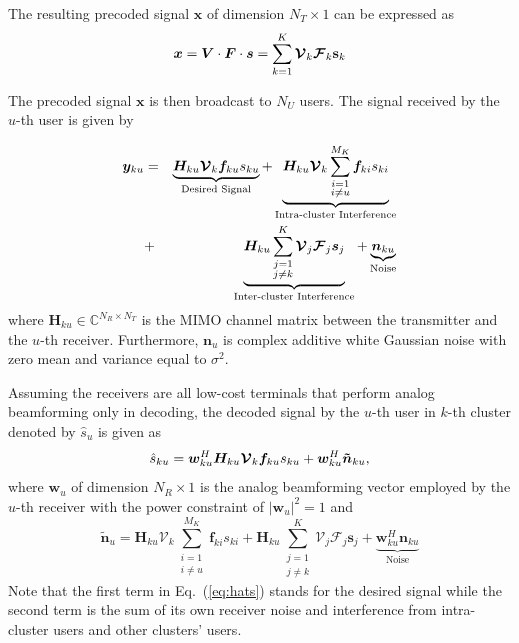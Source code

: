 \documentclass[conference]{IEEEtran}
\begin{document}
The resulting precoded signal $\bm x$ of dimension $N_T\times 1$  can be expressed as
\begin{equation}{\label{eq:transx}}
{\bm x} =  \bm{V}\cdot \bm{F}\cdot\bm{s} =\sum_{k=1}^K \bm{\mathcal{V}}_k \bm{\mathcal{F}}_k \mathbf{s}_k
\end{equation}

The precoded signal $\bm x$ is then broadcast to $N_U$ users. The signal received by the $u$-th user is given by

\begin{eqnarray}{\label{eq:rewrite}}
{\bm y}_{ku} &=&\underbrace{\bm{H}_{ku} \bm{\mathcal{V}}_k\bm{f}_{ku}{s}_{ku}}_\text{Desired Signal}+\underbrace{\bm{H}_{ku} \bm{\mathcal{V}}_k\sum_{\substack{i=1 \\ i\neq u}}^{M_K}\bm{f}_{ki}s_{ki}}_\text{Intra-cluster Interference} \nonumber\\
&+& \underbrace{\bm{H}_{ku}\sum_{\substack{j=1\\j\neq k}}^{K}\bm{\mathcal{V}}_j\bm{\mathcal{F}}_j\bm{s}_j}_\text{Inter-cluster Interference}+ \underbrace{\bm{n}_{ku}}_\text{Noise}
\end{eqnarray}
where $\bm{H}_{ku}$$\in\mathbb{C}^{N_R\times N_T}$ is the MIMO channel matrix between the transmitter and the $u$-th receiver\cite{el2014spatially}. Furthermore, $\bm{n}_u$ is complex additive white Gaussian noise with zero mean and variance equal to $\sigma^2$.

Assuming the receivers are all low-cost terminals that perform analog beamforming only in decoding, the decoded signal by the $u$-th user in $k$-th cluster denoted by $\hat{s}_u$ is given as
\begin{equation}{\label{eq:hats}}
\hat{s}_{ku} = \bm{w}_{ku}^H \bm{H}_{ku} \bm{\mathcal{V}}_k \bm{f}_{ku} s_{ku} + \bm{w}_{ku}^H \bm{\tilde{n}}_{ku},
\end{equation}
where ${\bm w}_u$ of dimension $N_R\times 1$ is the analog beamforming vector employed by the $u$-th receiver with the power constraint of $|\bm{w}_u|^2=1$ and
\begin{equation}\label{Eq:ntilde}
\bm{\tilde{n}}_u=\bm{H}_{ku} \bm{\mathcal{V}}_k\sum_{\substack{i=1 \\ i\neq u}}^{M_K}\bm{f}_{ki}s_{ki} + \bm{H}_{ku}\sum_{\substack{j=1\\j\neq k}}^{K}\bm{\mathcal{V}}_j\bm{\mathcal{F}}_j\bm{s}_j+  \underbrace{\bm{w}_{ku}^H \bm{n}_{ku}}_\text{Noise}
\end{equation}
Note that the first term in Eq.~(\ref{eq:hats}) stands for the desired signal while the second term is the sum of its own receiver noise and interference from intra-cluster users and other clusters' users.
\end{document}
